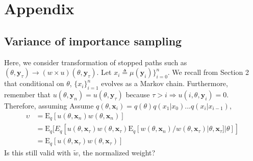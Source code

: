 \documentclass[11pt]{article}
\begin{document}

\section{Appendix}
\subsection{Variance of importance sampling}
Here, we consider transformation of stopped paths such as
$(\theta,\mathbf{y}_\tau)\rightarrow (w \times u)
(\theta,\mathbf{y}_{\tau})$. Let $x_i \triangleq
\mu(\mathbf{y}_i)\}_{i=0}^{n}$. We recall from Section 2 that
conditional on $\theta$, $\{x_i\}_{i=1}^{n}$ evolves as a Markov
chain. Furthermore, remember that
$u(\theta,\mathbf{y}_{n})=u(\theta,\mathbf{y}_{\tau})$ because
$\tau>i\Rightarrow u(i,\theta,\mathbf{y}_{i})=0$. Therefore,
assuming Assume
$q(\theta,\mathbf{x}_i)=q(\theta)q(x_1|x_0)...q(x_{i}|x_{i-1})$,
\begin{align}
\upsilon&=\mathrm{E}_q[u(\theta,\mathbf{x}_{n})w(\theta,\mathbf{x}_{n})]\\
&=\mathrm{E}_q[E_q[u(\theta,\mathbf{x}_{\tau})w(\theta,\mathbf{x}_{\tau})\mathrm{E}_q[w(\theta,\mathbf{x}_{n})/w(\theta,\mathbf{x}_{\tau})|\theta,\mathbf{x}_{\tau}]|\theta]]\\
&=\mathrm{E}_q[u(\theta,\mathbf{x}_{\tau})w(\theta,\mathbf{x}_{\tau})]
\end{align}Is this still valid with $\tilde w$, the normalized
weight?
\end{document}
